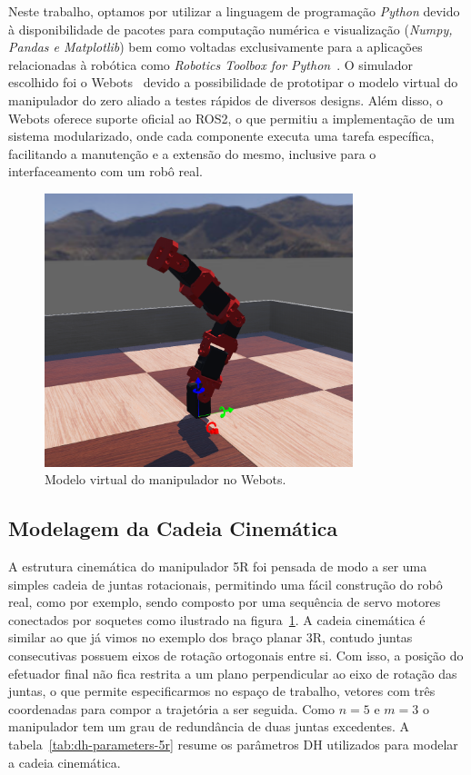 Neste trabalho, optamos por utilizar a linguagem de programação \emph{Python}
devido à disponibilidade de pacotes para computação numérica e visualização
(\emph{Numpy, Pandas e Matplotlib}) bem como voltadas exclusivamente para a
aplicações relacionadas à robótica como \emph{Robotics Toolbox for
    Python}~\cite{rtb}. O simulador escolhido foi o Webots~\cite{webots} devido a
possibilidade de prototipar o modelo virtual do manipulador do zero aliado a
testes rápidos de diversos designs. Além disso, o Webots oferece suporte
oficial ao ROS2, o que permitiu a implementação de um sistema modularizado,
onde cada componente executa uma tarefa específica, facilitando a manutenção e
a extensão do mesmo, inclusive para o interfaceamento com um robô real.

\begin{figure}
    \centering
    \includegraphics[width=0.8\textwidth]{./Images/webots-robot.png}
    \caption{Modelo virtual do manipulador no Webots.}\label{fig:robot-model}
\end{figure}

\subsection*{Modelagem da Cadeia Cinemática}

A estrutura cinemática do manipulador 5R foi pensada de modo a ser uma simples
cadeia de juntas rotacionais, permitindo uma fácil construção do robô real,
como por exemplo, sendo composto por uma sequência de servo motores conectados
por soquetes como ilustrado na figura~\ref{fig:robot-model}. A cadeia
cinemática é similar ao que já vimos no exemplo dos braço planar 3R, contudo
juntas consecutivas possuem eixos de rotação ortogonais entre si. Com isso, a
posição do efetuador final não fica restrita a um plano perpendicular ao eixo
de rotação das juntas, o que permite especificarmos no espaço de trabalho,
vetores com três coordenadas para compor a trajetória a ser seguida. Como \(n =
5 \text{ e } m = 3\) o manipulador tem um grau de redundância de duas juntas
excedentes. A tabela~\ref{tab:dh-parameters-5r} resume os parâmetros DH
utilizados para modelar a cadeia cinemática.

